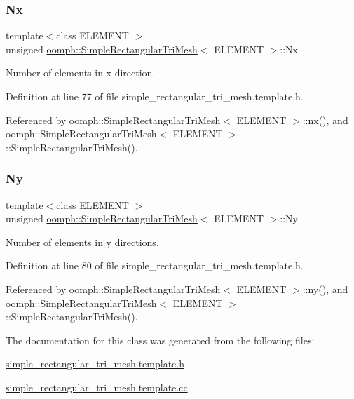 \subsubsection{\texorpdfstring{Nx}{Nx}}
{\footnotesize\ttfamily template$<$class E\+L\+E\+M\+E\+NT $>$ \\
unsigned \hyperlink{classoomph_1_1SimpleRectangularTriMesh}{oomph\+::\+Simple\+Rectangular\+Tri\+Mesh}$<$ E\+L\+E\+M\+E\+NT $>$\+::Nx\hspace{0.3cm}{\ttfamily [private]}}



Number of elements in x direction. 



Definition at line 77 of file simple\+\_\+rectangular\+\_\+tri\+\_\+mesh.\+template.\+h.



Referenced by oomph\+::\+Simple\+Rectangular\+Tri\+Mesh$<$ E\+L\+E\+M\+E\+N\+T $>$\+::nx(), and oomph\+::\+Simple\+Rectangular\+Tri\+Mesh$<$ E\+L\+E\+M\+E\+N\+T $>$\+::\+Simple\+Rectangular\+Tri\+Mesh().

\mbox{\label{classoomph_1_1SimpleRectangularTriMesh_ac180c4ab5947c4417d912bc75621fc7e}} 
\subsubsection{\texorpdfstring{Ny}{Ny}}
{\footnotesize\ttfamily template$<$class E\+L\+E\+M\+E\+NT $>$ \\
unsigned \hyperlink{classoomph_1_1SimpleRectangularTriMesh}{oomph\+::\+Simple\+Rectangular\+Tri\+Mesh}$<$ E\+L\+E\+M\+E\+NT $>$\+::Ny\hspace{0.3cm}{\ttfamily [private]}}



Number of elements in y directions. 



Definition at line 80 of file simple\+\_\+rectangular\+\_\+tri\+\_\+mesh.\+template.\+h.



Referenced by oomph\+::\+Simple\+Rectangular\+Tri\+Mesh$<$ E\+L\+E\+M\+E\+N\+T $>$\+::ny(), and oomph\+::\+Simple\+Rectangular\+Tri\+Mesh$<$ E\+L\+E\+M\+E\+N\+T $>$\+::\+Simple\+Rectangular\+Tri\+Mesh().



The documentation for this class was generated from the following files\+:\begin{DoxyCompactItemize}
\item 
\hyperlink{simple__rectangular__tri__mesh_8template_8h}{simple\+\_\+rectangular\+\_\+tri\+\_\+mesh.\+template.\+h}\item 
\hyperlink{simple__rectangular__tri__mesh_8template_8cc}{simple\+\_\+rectangular\+\_\+tri\+\_\+mesh.\+template.\+cc}\end{DoxyCompactItemize}
